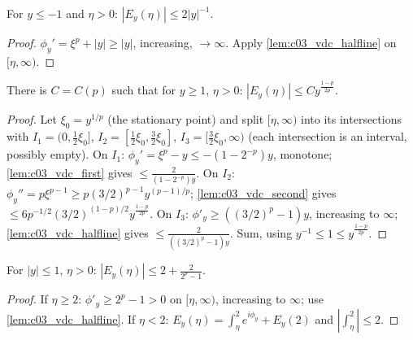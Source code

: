 \begin{lemma}
  \label{lem:c03_stationary_negative}
  For $y\le-1$ and $\eta>0$: $|E_y(\eta)|\le2|y|^{-1}$.
\end{lemma}
\begin{proof}
  $\phi_y'=\xi^p+|y|\ge|y|$, increasing, $\to\infty$. Apply \cref{lem:c03_vdc_halfline} on $[\eta,\infty)$.
\end{proof}

\begin{lemma}
  \label{lem:c03_stationary_positive}
  There is $C=C(p)$ such that for $y\ge1$, $\eta>0$: $|E_y(\eta)|\le Cy^{\frac{1-p}{2p}}$.
\end{lemma}
\begin{proof}
  Let $\xi_0=y^{1/p}$ (the stationary point) and split $[\eta,\infty)$ into its intersections with
  $I_1=(0,\frac12\xi_0]$, $I_2=[\frac12\xi_0,\frac32\xi_0]$, $I_3=[\frac32\xi_0,\infty)$ (each intersection is an interval, possibly empty).
  On $I_1$: $\phi_y'=\xi^p-y\le-(1-2^{-p})y$, monotone; \cref{lem:c03_vdc_first} gives $\le\frac{2}{(1-2^{-p})y}$.
  On $I_2$: $\phi_y''=p\xi^{p-1}\ge p(3/2)^{p-1}y^{(p-1)/p}$; \cref{lem:c03_vdc_second} gives $\le6p^{-1/2}(3/2)^{(1-p)/2}y^{\frac{1-p}{2p}}$.
  On $I_3$: $\phi'_y\ge((3/2)^p-1)y$, increasing to $\infty$; \cref{lem:c03_vdc_halfline} gives $\le\frac2{((3/2)^p-1)y}$.
  Sum, using $y^{-1}\le1\le y^{\frac{1-p}{2p}}$.
\end{proof}

\begin{lemma}
  \label{lem:c03_stationary_small}
  For $|y|\le1$, $\eta>0$: $|E_y(\eta)|\le2+\frac{2}{2^p-1}$.
\end{lemma}
\begin{proof}
  If $\eta\ge2$: $\phi'_y\ge2^p-1>0$ on $[\eta,\infty)$, increasing to $\infty$; use \cref{lem:c03_vdc_halfline}. If $\eta<2$: $E_y(\eta)=\int_\eta^2e^{i\phi_y}+E_y(2)$ and $|\int_\eta^2|\le2$.
\end{proof}


